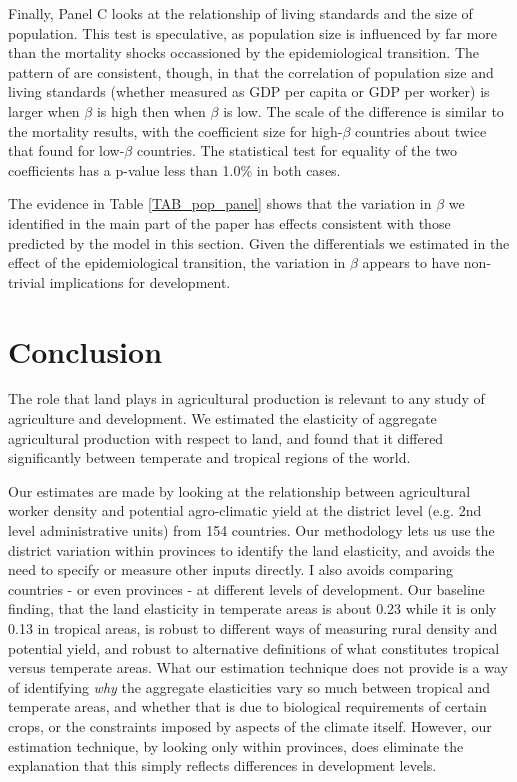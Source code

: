 \documentclass[11pt]{article}
\begin{document}
Finally, Panel C looks at the relationship of living standards and the size of population. This test is speculative, as population size is influenced by far more than the mortality shocks occassioned by the epidemiological transition. The pattern of are consistent, though, in that the correlation of population size and living standards (whether measured as GDP per capita or GDP per worker) is larger when $\beta$ is high then when $\beta$ is low. The scale of the difference is similar to the mortality results, with the coefficient size for high-$\beta$ countries about twice that found for low-$\beta$ countries. The statistical test for equality of the two coefficients has a p-value less than 1.0\% in both cases.

The evidence in Table \ref{TAB_pop_panel} shows that the variation in $\beta$ we identified in the main part of the paper has effects consistent with those predicted by the model in this section. Given the differentials we estimated in the effect of the epidemiological transition, the variation in $\beta$ appears to have non-trivial implications for development.

\section{Conclusion}
The role that land plays in agricultural production is relevant to any study of agriculture and development. We estimated the elasticity of aggregate agricultural production with respect to land, and found that it differed significantly between temperate and tropical regions of the world.

Our estimates are made by looking at the relationship between agricultural worker density and potential agro-climatic yield at the district level (e.g. 2nd level administrative units) from 154 countries. Our methodology lets us use the district variation within provinces to identify the land elasticity, and avoids the need to specify or measure other inputs directly. I also avoids comparing countries - or even provinces - at different levels of development. Our baseline finding, that the land elasticity in temperate areas is about 0.23 while it is only 0.13 in tropical areas, is robust to different ways of measuring rural density and potential yield, and robust to alternative definitions of what constitutes tropical versus temperate areas. What our estimation technique does not provide is a way of identifying \textit{why} the aggregate elasticities vary so much between tropical and temperate areas, and whether that is due to biological requirements of certain crops, or the constraints imposed by aspects of the climate itself. However, our estimation technique, by looking only within provinces, does eliminate the explanation that this simply reflects differences in development levels.
\end{document}
